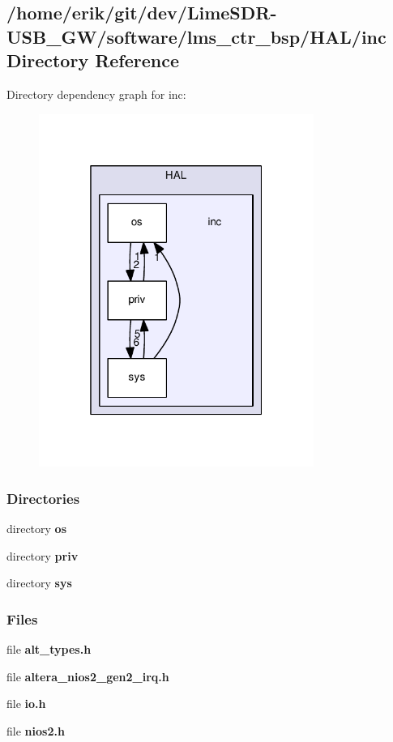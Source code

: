 \subsection{/home/erik/git/dev/\+Lime\+S\+D\+R-\/\+U\+S\+B\+\_\+\+G\+W/software/lms\+\_\+ctr\+\_\+bsp/\+H\+A\+L/inc Directory Reference}
\label{dir_06118efd94fe1728bcd33638b28a8fc8}
Directory dependency graph for inc\+:
\nopagebreak
\begin{figure}[H]
\begin{center}
\leavevmode
\includegraphics[width=254pt]{dir_06118efd94fe1728bcd33638b28a8fc8_dep}
\end{center}
\end{figure}
\subsubsection*{Directories}
\begin{DoxyCompactItemize}
\item 
directory {\bf os}
\item 
directory {\bf priv}
\item 
directory {\bf sys}
\end{DoxyCompactItemize}
\subsubsection*{Files}
\begin{DoxyCompactItemize}
\item 
file {\bf alt\+\_\+types.\+h}
\item 
file {\bf altera\+\_\+nios2\+\_\+gen2\+\_\+irq.\+h}
\item 
file {\bf io.\+h}
\item 
file {\bf nios2.\+h}
\end{DoxyCompactItemize}

